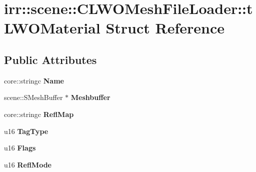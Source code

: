 \hypertarget{structirr_1_1scene_1_1_c_l_w_o_mesh_file_loader_1_1t_l_w_o_material}{\section{irr\-:\-:scene\-:\-:C\-L\-W\-O\-Mesh\-File\-Loader\-:\-:t\-L\-W\-O\-Material Struct Reference}
\label{structirr_1_1scene_1_1_c_l_w_o_mesh_file_loader_1_1t_l_w_o_material}
}
\subsection*{Public Attributes}
\begin{DoxyCompactItemize}
\item 
\hypertarget{structirr_1_1scene_1_1_c_l_w_o_mesh_file_loader_1_1t_l_w_o_material_a0a236390e0861d7549c6414dc97821b1}{core\-::stringc {\bfseries Name}}\label{structirr_1_1scene_1_1_c_l_w_o_mesh_file_loader_1_1t_l_w_o_material_a0a236390e0861d7549c6414dc97821b1}

\item 
\hypertarget{structirr_1_1scene_1_1_c_l_w_o_mesh_file_loader_1_1t_l_w_o_material_a14ab4a6dad64b0964102f8d91cbfd3fd}{scene\-::\-S\-Mesh\-Buffer $\ast$ {\bfseries Meshbuffer}}\label{structirr_1_1scene_1_1_c_l_w_o_mesh_file_loader_1_1t_l_w_o_material_a14ab4a6dad64b0964102f8d91cbfd3fd}

\item 
\hypertarget{structirr_1_1scene_1_1_c_l_w_o_mesh_file_loader_1_1t_l_w_o_material_a49b1e0b7dfe6d31fb2a5411ad3dfedcd}{core\-::stringc {\bfseries Refl\-Map}}\label{structirr_1_1scene_1_1_c_l_w_o_mesh_file_loader_1_1t_l_w_o_material_a49b1e0b7dfe6d31fb2a5411ad3dfedcd}

\item 
\hypertarget{structirr_1_1scene_1_1_c_l_w_o_mesh_file_loader_1_1t_l_w_o_material_a65651afc455f743746641562ec893c21}{u16 {\bfseries Tag\-Type}}\label{structirr_1_1scene_1_1_c_l_w_o_mesh_file_loader_1_1t_l_w_o_material_a65651afc455f743746641562ec893c21}

\item 
\hypertarget{structirr_1_1scene_1_1_c_l_w_o_mesh_file_loader_1_1t_l_w_o_material_a8499d0a6790892bdb15c68fe2d20d12f}{u16 {\bfseries Flags}}\label{structirr_1_1scene_1_1_c_l_w_o_mesh_file_loader_1_1t_l_w_o_material_a8499d0a6790892bdb15c68fe2d20d12f}

\item 
\hypertarget{structirr_1_1scene_1_1_c_l_w_o_mesh_file_loader_1_1t_l_w_o_material_a74bf877a6ef03095d6673e29575296a1}{u16 {\bfseries Refl\-Mode}}\label{structirr_1_1scene_1_1_c_l_w_o_mesh_file_loader_1_1t_l_w_o_material_a74bf877a6ef03095d6673e29575296a1}


\end{DoxyCompactItemize}
